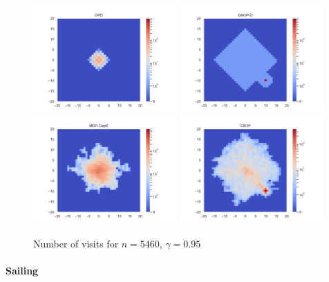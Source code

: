 \documentclass[runningheads]{llncs}
\begin{document}
\begin{figure}[H]
    \centering
    \includegraphics[width=0.49\textwidth]{img/occupations_OPD.pdf}
	\hfill
    \includegraphics[width=0.49\textwidth]{img/occupations_GBOP-D.pdf}
    \includegraphics[width=0.49\textwidth]{img/occupations_MDP-GapE.pdf}
    \hfill
    \includegraphics[width=0.49\textwidth]{img/occupations_GBOP.pdf}
    \caption{Number of visits for $n = 5460$, $\gamma=0.95$}
    \label{fig:visits}
\end{figure}


\paragraph{Sailing}
\end{document}
